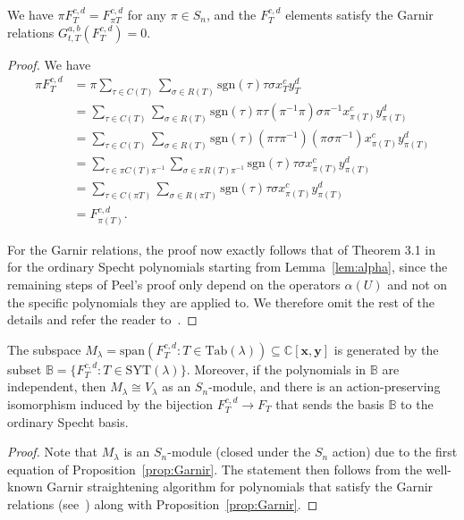 \documentclass[ALCO,Unicode]{cedram}
\newcommand{\SYT}{\mathrm{SYT}}
\newcommand{\sgn}{\mathrm{sgn}}
\newcommand{\Tab}{\mathrm{Tab}}
\begin{document}
\begin{prop}\label{prop:Garnir}
	We have $\pi F_T^{c,d} = F_{\pi T}^{c,d}$ for any $\pi\in S_n$, and the $F_T^{c,d}$ elements satisfy the Garnir relations  $G^{a,b}_{t,T}(F_T^{c,d})=0$.
\end{prop}

\begin{proof}
	We have 
	\begin{align*}
	\pi F_T^{c,d} &= \pi \sum_{\tau \in C(T)}\sum_{\sigma \in R(T)}\sgn(\tau) \tau \sigma x_T^cy_T^d\\
	&= \sum_{\tau\in C(T)}\sum_{\sigma\in R(T)}\sgn(\tau)\pi\tau(\pi^{-1}\pi)\sigma\pi^{-1}x_{\pi(T)}^c y_{\pi(T)}^d \\
	&= \sum_{\tau\in C(T)}\sum_{\sigma\in R(T)}\sgn(\tau)(\pi\tau\pi^{-1})(\pi\sigma\pi^{-1})x_{\pi(T)}^c y_{\pi(T)}^d \\
	&= \sum_{\tau\in \pi C(T)\pi^{-1}}\sum_{\sigma\in \pi R(T)\pi^{-1}}\sgn(\tau)\tau \sigma x_{\pi(T)}^c y_{\pi(T)}^d \\
	&= \sum_{\tau\in C(\pi T)}\sum_{\sigma\in R(\pi T)}\sgn(\tau)\tau \sigma x_{\pi(T)}^c y_{\pi(T)}^d \\
	&= F^{c,d}_{\pi(T)}.
	\end{align*}  
	
	For the Garnir relations, the proof now exactly follows that of Theorem 3.1 in~\cite{Peel} for the ordinary Specht polynomials starting from Lemma~\ref{lem:alpha}, since the remaining steps of Peel's proof only depend on the operators $\alpha(U)$ and not on the specific polynomials they are applied to.  We therefore omit the rest of the details and refer the reader to~\cite{Peel}.
\end{proof}

\begin{prop}\label{prop:irreducible}
	The subspace $M_\lambda=\mathrm{span}(F_T^{c,d}:T\in \Tab(\lambda))\subseteq \mathbb{C}[\mathbf{x},\mathbf{y}]$ is generated by the subset $\mathbb{B}=\{F_T^{c,d}:T\in \SYT(\lambda)\}$.  Moreover, if the polynomials in $\mathbb{B}$ are independent, then $M_\lambda\cong V_\lambda$ as an $S_n$-module, and there is an action-preserving isomorphism induced by the bijection $F_T^{c,d}\to F_T$ that sends the basis $\mathbb{B}$ to the ordinary Specht basis.
\end{prop}

\begin{proof}
	Note that $M_\lambda$
	is an $S_n$-module (closed under the $S_n$ action) due to the first equation of Proposition~\ref{prop:Garnir}. 
	The statement then follows from the well-known Garnir straightening algorithm for polynomials that satisfy the Garnir relations (see~\cite{Sagan}) along with Proposition~\ref{prop:Garnir}.
\end{proof}
\end{document}
